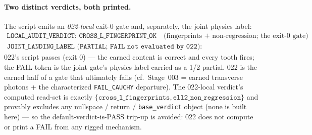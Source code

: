 \paragraph{Two distinct verdicts, both printed.}
The script emits an \emph{022-local} exit-0 gate and, separately, the joint physics label:
\[
\begin{array}{l}
\texttt{LOCAL\_AUDIT\_VERDICT: CROSS\_L\_FINGERPRINT\_OK}\quad\text{(fingerprints + non-regression; the exit-0 gate)}\\
\texttt{JOINT\_LANDING\_LABEL (PARTIAL; FAIL not evaluated by 022): FAIL\_UNDERDETERMINED\_NOT\_PREDICTIVE (1/2)}
\end{array}
\]
022's script passes (exit 0) --- the earned content is correct and every tooth fires; the FAIL token is the joint gate's
physics label carried as a 1/2 partial. 022 is the earned half of a gate that ultimately fails (cf.\ Stage~003 = earned
transverse photons + the characterized \texttt{FAIL\_CAUCHY} departure). The 022-local verdict's computed read-set is exactly
\(\{\texttt{cross\_l\_fingerprints},\texttt{ell2\_non\_regression}\}\) and provably excludes any nullspace / return /
\texttt{base\_verdict} object (none is built here) --- so the default-verdict-is-PASS trip-up is avoided: 022 does not compute
or print a FAIL from any rigged mechanism.

